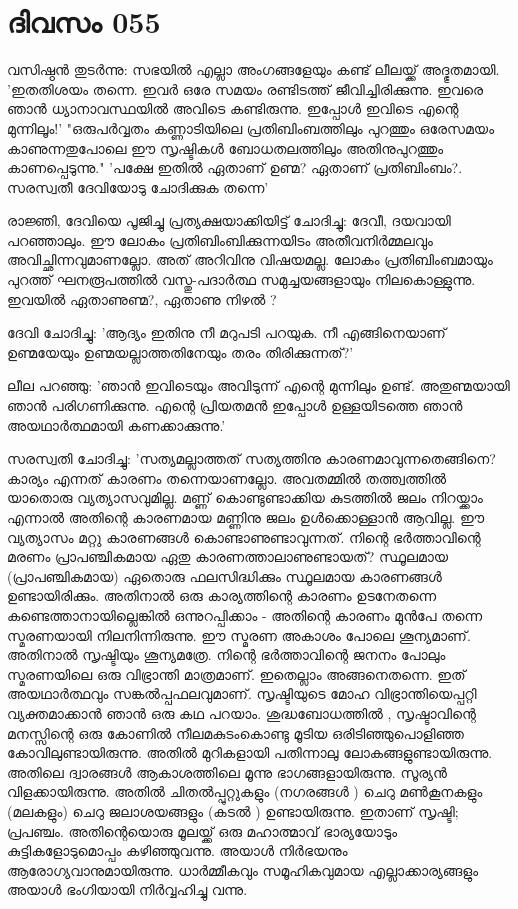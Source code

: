  
\section{ദിവസം 055}


വസിഷ്ഠന്‍ തുടര്‍ന്നു: സഭയില്‍ എല്ലാ അംഗങ്ങളേയും കണ്ട്‌ ലീലയ്ക്ക്‌ അദ്ഭുതമായി. 'ഇതതിശയം തന്നെ. ഇവര്‍ ഒരേ സമയം രണ്ടിടത്ത്‌ ജീവിച്ചിരിക്കുന്നു. ഇവരെ ഞാന്‍ ധ്യാനാവസ്ഥയില്‍ അവിടെ കണ്ടിരുന്നു. ഇപ്പോള്‍ ഇവിടെ എന്റെ മുന്നിലൂം!' "ഒരുപര്‍വ്വതം കണ്ണാടിയിലെ പ്രതിബിംബത്തിലും പുറത്തും ഒരേസമയം കാണുന്നതുപോലെ ഈ സൃഷ്ടികള്‍ ബോധതലത്തിലും അതിനുപുറത്തും കാണപ്പെടുന്നു." 'പക്ഷേ ഇതില്‍ ഏതാണ്‌ ഉണ്മ? ഏതാണ്‌ പ്രതിബിംബം?. സരസ്വതീ ദേവിയോടു ചോദിക്കുക തന്നെ'

രാജ്ഞി, ദേവിയെ പൂജിച്ചു പ്രത്യക്ഷയാക്കിയിട്ട്‌ ചോദിച്ചു: ദേവീ, ദയവായി പറഞ്ഞാലും. ഈ ലോകം പ്രതിബിംബിക്കുന്നയിടം അതീവനിര്‍മ്മലവും അവിച്ഛിന്നവുമാണല്ലോ. അത്‌ അറിവിനു വിഷയമല്ല. ലോകം പ്രതിബിംബമായും പുറത്ത്‌ ഘനരൂപത്തില്‍ വസ്തു-പദാര്‍ത്ഥ സമുച്ചയങ്ങളായും നിലകൊള്ളുന്നു. ഇവയില്‍ ഏതാണുണ്മ?, ഏതാണു നിഴല്‍ ?

ദേവി ചോദിച്ചു: 'ആദ്യം ഇതിനു നീ മറുപടി പറയുക. നീ എങ്ങിനെയാണ്‌ ഉണ്മയേയും ഉണ്മയല്ലാത്തതിനേയും തരം തിരിക്കുന്നത്‌?'

ലീല പറഞ്ഞു: 'ഞാന്‍ ഇവിടെയും അവിടുന്ന് എന്റെ മുന്നിലും ഉണ്ട്‌. അതുണ്മയായി ഞാന്‍ പരിഗണിക്കുന്നു. എന്റെ പ്രിയതമന്‍ ഇപ്പോള്‍ ഉള്ളയിടത്തെ ഞാന്‍ അയഥാര്‍ത്ഥമായി കണക്കാക്കുന്നു.'

സരസ്വതി ചോദിച്ചു: 'സത്യമല്ലാത്തത്‌ സത്യത്തിനു കാരണമാവുന്നതെങ്ങിനെ? കാര്യം എന്നത്‌ കാരണം തന്നെയാണല്ലോ. അവതമ്മില്‍ തത്ത്വത്തില്‍ യാതൊരു വ്യത്യാസവുമില്ല. മണ്ണ് കൊണ്ടുണ്ടാക്കിയ കുടത്തില്‍ ജലം നിറയ്ക്കാം എന്നാല്‍ അതിന്റെ കാരണമായ മണ്ണിനു ജലം ഉള്‍ക്കൊള്ളാന്‍ ആവില്ല. ഈ വ്യത്യാസം മറ്റു കാരണങ്ങള്‍ കൊണ്ടാണുണ്ടാവുന്നത്‌. നിന്റെ ഭര്‍ത്താവിന്റെ മരണം പ്രാപഞ്ചികമായ ഏതു കാരണത്താലാണുണ്ടായത്‌? സ്ഥൂലമായ (പ്രാപഞ്ചികമായ) ഏതൊരു ഫലസിദ്ധിക്കും സ്ഥൂലമായ കാരണങ്ങള്‍ ഉണ്ടായിരിക്കും. അതിനാല്‍ ഒരു കാര്യത്തിന്റെ കാരണം ഉടനേതന്നെ കണ്ടെത്താനായില്ലെങ്കില്‍ ഒന്നുറപ്പിക്കാം - അതിന്റെ കാരണം മുന്‍പേ തന്നെ സ്മരണയായി നിലനിന്നിരുന്നു. ഈ സ്മരണ അകാശം പോലെ ശൂന്യമാണ്‌. അതിനാല്‍ സൃഷ്ടിയും ശൂന്യമത്രേ. നിന്റെ ഭര്‍ത്താവിന്റെ ജനനം പോലും സ്മരണയിലെ ഒരു വിഭ്രാന്തി മാത്രമാണ്‌. ഇതെല്ലാം അങ്ങനെതന്നെ. ഇത്‌ അയഥാര്‍ത്ഥവും സങ്കല്‍പ്പഫലവുമാണ്‌. സൃഷ്ടിയുടെ മോഹ വിഭ്രാന്തിയെപ്പറ്റി വ്യക്തമാക്കാന്‍ ഞാന്‍ ഒരു കഥ പറയാം. ശുദ്ധബോധത്തില്‍ , സൃഷ്ടാവിന്റെ മനസ്സിന്റെ ഒരു കോണില്‍ നീലമകുടംകൊണ്ടു മൂടിയ ഒരിടിഞ്ഞുപൊളിഞ്ഞ കോവിലുണ്ടായിരുന്നു. അതില്‍ മുറികളായി പതിന്നാലു ലോകങ്ങളുണ്ടായിരുന്നു. അതിലെ ദ്വാരങ്ങള്‍ ആകാശത്തിലെ മൂന്നു ഭാഗങ്ങളായിരുന്നു. സൂര്യന്‍ വിളക്കായിരുന്നു. അതില്‍ ചിതല്‍പ്പുറ്റുകളും (നഗരങ്ങള്‍ ) ചെറു മണ്‍കൂനകളും (മലകളും) ചെറു ജലാശയങ്ങളും (കടല്‍ ) ഉണ്ടായിരുന്നു. ഇതാണ്‌ സൃഷ്ടി; പ്രപഞ്ചം. അതിന്റെയൊരു മൂലയ്ക്ക്‌ ഒരു മഹാത്മാവ്‌ ഭാര്യയോടും കുട്ടികളോടുമൊപ്പം കഴിഞ്ഞുവന്നു. അയാള്‍ നിര്‍ഭയനും ആരോഗ്യവാനുമായിരുന്നു. ധാര്‍മ്മീകവും സമൂഹികവുമായ എല്ലാക്കാര്യങ്ങളും അയാള്‍ ഭംഗിയായി നിര്‍വ്വഹിച്ചു വന്നു.
